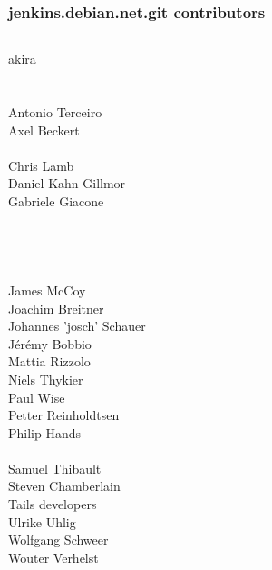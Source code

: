 \documentclass[14pt]{beamer}
\begin{document}
\begin{frame}
 \frametitle{jenkins.debian.net.git contributors}
 \begin{center}
  \begin{columns}
   \small
    {akira} \\
     \\
     \\
    {Antonio Terceiro} \\
    {Axel Beckert} \\
     \\
    {Chris Lamb} \\
    {Daniel Kahn Gillmor} \\
    {Gabriele Giacone} \\
     \\
     \\
     \\
     \\
    {James McCoy} \\
    {Joachim Breitner} \\
    {Johannes 'josch' Schauer} \\
    {Jérémy Bobbio} \\
    {Mattia Rizzolo} \\
    {Niels Thykier} \\
    {Paul Wise} \\
    {Petter Reinholdtsen} \\
    {Philip Hands} \\
     \\
    {Samuel Thibault} \\
    {Steven Chamberlain} \\
    {Tails developers} \\
    {Ulrike Uhlig} \\
    {Wolfgang Schweer} \\
    {Wouter Verhelst} \\
  \end{columns}
 \end{center}
\end{frame}
\end{document}
